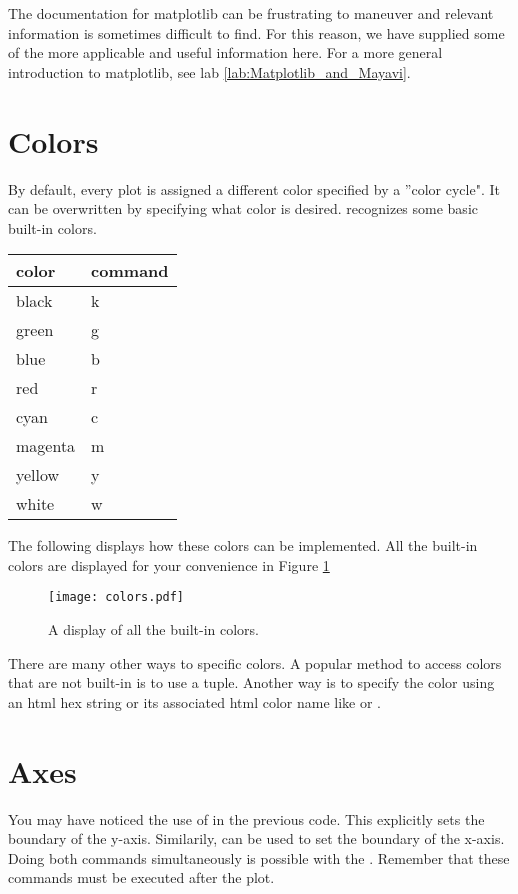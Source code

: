 \label{mpltables}


The documentation for matplotlib can be frustrating to maneuver and relevant information is sometimes difficult to find. For this reason, we have supplied some of the more applicable and useful information here. 
For a more general introduction to matplotlib, see lab \ref{lab:Matplotlib_and_Mayavi}.


\section*{Colors}
By default, every plot is assigned a different color specified by a ''color cycle". It can be overwritten by specifying what color is desired.  recognizes some basic built-in colors. 

\begin{tabular}
{|l||l|}
\hline
color & command \\
\hline
black & k \\
green & g \\
blue & b \\
red & r \\
cyan & c \\
magenta & m \\
yellow & y \\
white & w\\
\hline

\end{tabular}


The following displays how these colors can be implemented. All the built-in colors are displayed for your convenience in Figure \ref{colors}


\begin{figure} 
\texttt{[image: colors.pdf]}
\caption{A display of all the built-in colors.}
\label{colors} 
\end{figure}


There are many other ways to specific colors. A popular method to access colors that are not built-in is to use a  tuple. Another way is to specify the color using an html hex string or its associated html color name like  or . 

\section*{Axes}
You may have noticed the use of  in the previous code. This explicitly sets the boundary of the y-axis. Similarily,  can be used to set the boundary of the x-axis. 
Doing both commands simultaneously is possible with the . 
Remember that these commands must be executed after the plot. 

